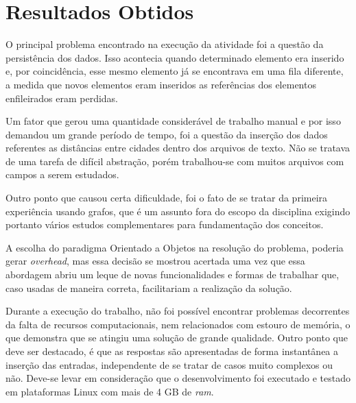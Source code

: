 \chapter*[Resultados Obtidos]{Resultados Obtidos}

O principal problema encontrado na execução da atividade foi a questão da persistência dos 
dados. Isso acontecia quando determinado elemento era inserido e, por coincidência, esse mesmo 
elemento já se encontrava em uma fila diferente, a medida que novos elementos eram inseridos as referências dos elementos enfileirados eram perdidas.

Um fator que gerou uma quantidade considerável de trabalho manual e por isso demandou um grande período de 
tempo, foi a questão da inserção dos dados referentes as distâncias entre cidades dentro dos arquivos de 
texto. Não se tratava de uma tarefa de difícil abstração, porém trabalhou-se com muitos arquivos com campos 
a serem estudados. 

Outro ponto que causou certa dificuldade, foi o fato de se tratar da primeira experiência usando grafos,
que é um assunto fora do escopo da disciplina exigindo portanto vários estudos complementares para 
fundamentação dos conceitos. 

A escolha do paradigma Orientado a Objetos na resolução do problema, poderia gerar \textit{overhead}, mas essa decisão se mostrou acertada uma vez que essa abordagem abriu um leque de novas funcionalidades e 
formas de trabalhar que, caso usadas de maneira correta, facilitariam a realização da solução.

Durante a execução do trabalho, não foi possível encontrar problemas decorrentes da falta de recursos 
computacionais, nem relacionados com estouro de memória, o que demonstra que se atingiu uma solução de 
grande qualidade. Outro ponto que deve ser destacado, é que as respostas são apresentadas de forma instantânea a inserção das entradas, independente de se tratar de casos muito complexos ou não. Deve-se levar em consideração que o desenvolvimento foi executado e testado em plataformas Linux com mais de 4 GB de \textit{ram}.